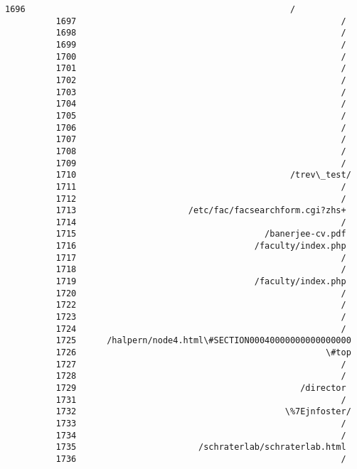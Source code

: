 \documentclass[11pt]{article}
\begin{document}
\begin{Verbatim}[commandchars=\\\{\}]
          1696                                                    /
          1697                                                    /
          1698                                                    /
          1699                                                    /
          1700                                                    /
          1701                                                    /
          1702                                                    /
          1703                                                    /
          1704                                                    /
          1705                                                    /
          1706                                                    /
          1707                                                    /
          1708                                                    /
          1709                                                    /
          1710                                          /trev\_test/
          1711                                                    /
          1712                                                    /
          1713                      /etc/fac/facsearchform.cgi?zhs+
          1714                                                    /
          1715                                     /banerjee-cv.pdf
          1716                                   /faculty/index.php
          1717                                                    /
          1718                                                    /
          1719                                   /faculty/index.php
          1720                                                    /
          1722                                                    /
          1723                                                    /
          1724                                                    /
          1725      /halpern/node4.html\#SECTION00040000000000000000
          1726                                                 \#top
          1727                                                    /
          1728                                                    /
          1729                                            /director
          1731                                                    /
          1732                                         \%7Ejnfoster/
          1733                                                    /
          1734                                                    /
          1735                        /schraterlab/schraterlab.html
          1736                                                    /

\end{Verbatim}
\end{document}
